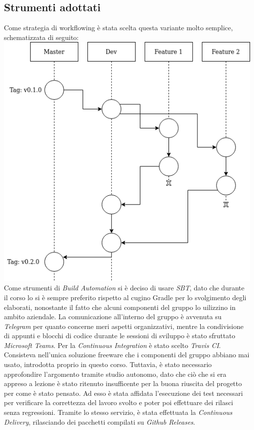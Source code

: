 \documentclass{article}
\begin{document}
    \subsection{Strumenti adottati}
    Come strategia di workflowing è stata scelta questa variante molto semplice, schematizzata di seguito:
    \includegraphics[width=\textwidth, scale=0.8]{git-workflow-1-1.png}
    Come strumenti di \textit{Build Automation} si è deciso di usare \textit{SBT}, dato che durante il corso lo si è
    sempre preferito rispetto al cugino Gradle per lo svolgimento degli elaborati, nonostante il fatto che alcuni
    componenti del gruppo lo uilizzino in ambito aziendale.
    La comunicazione all'interno del gruppo è avvenuta su \textit{Telegram} per quanto concerne meri aspetti
    organizzativi, mentre la condivisione di appunti e blocchi di codice durante le sessioni di sviluppo è stato
    sfruttato \textit{Microsoft Teams}.
    Per la \textit{Continuous Integration} è stato scelto \textit{Travis CI}. Consisteva nell'unica soluzione freeware
    che i componenti del gruppo abbiano mai usato, introdotta proprio in questo corso. Tuttavia, è stato necessario
    approfondire l'argomento tramite studio autonomo, dato che ciò che si era appreso a lezione è stato ritenuto
    insufficente per la buona riuscita del progetto per come è stato pensato. Ad esso è stata affidata l'esecuzione dei
    test necessari per verificare la correttezza del lavoro svolto e poter poi effettuare dei rilasci senza regressioni.
    Tramite lo stesso servizio, è stata effettuata la \textit{Continuous Delivery}, rilasciando dei pacchetti compilati
    su \textit{Github Releases}.
\end{document}
